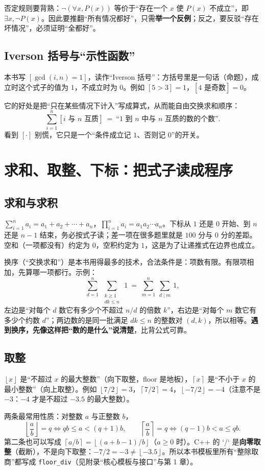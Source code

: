 \documentclass[UTF8,a4paper,11pt,twoside,openright,fontset=fandol]{ctexbook}
\theoremstyle{definition}
\newcommand{\floor}[1]{\left\lfloor #1\right\rfloor}
\newcommand{\ceil}[1]{\left\lceil #1\right\rceil}
\newcommand{\iva}[1]{\left[#1\right]}
\begin{document}
否定规则要背熟：$\lnot(\forall x,P(x))$ 等价于“存在一个 $x$ 使 $P(x)$ 不成立”，即 $\exists x,\lnot P(x)$。因此要推翻“所有情况都好”，只需\textbf{举一个反例}；反之，要反驳“存在坏情况”，必须证明“全都好”。

\subsection{Iverson 括号与“示性函数”}
本书写 $\iva{\gcd(i,n)=1}$，读作“Iverson 括号”：方括号里是一句话（命题），成立时这个式子的值为 $1$，不成立时为 $0$。例如 $\iva{5>3}=1$，$\iva{4\text{ 是奇数}}=0$。

它的好处是把“只在某些情况下计入”写成算式，从而能自由交换求和顺序：
\[
\sum_{i=1}^{n}\iva{i\text{ 与 }n\text{ 互质}}\ =\ \text{“}1\text{ 到 }n\text{ 中与 }n\text{ 互质的数的个数”}.
\]
看到 $\iva{\cdot}$ 别慌，它只是一个“条件成立记 $1$、否则记 $0$”的开关。

\section{求和、取整、下标：把式子读成程序}
\subsection{求和与求积}
$\sum_{i=1}^{n}a_i=a_1+a_2+\cdots+a_n$，$\prod_{i=1}^{n}a_i=a_1a_2\cdots a_n$。下标从 $1$ 还是 $0$ 开始、到 $n$ 还是 $n-1$ 结束，务必按式子读；差一项在很多题里就是 $100$ 分与 $0$ 分的差距。空和（一项都没有）约定为 $0$，空积约定为 $1$，这是为了让递推式在边界也成立。

换序（“交换求和”）是本书用得最多的技术，合法条件是：项数有限。有限项相加，先算哪一项都行。示例：
\[
\sum_{d=1}^{n}\ \sum_{\substack{k\ge 1\\dk\le n}}\ 1\ =\ \sum_{m=1}^{n}\ \sum_{d\mid m}\ 1,
\]
左边是“对每个 $d$ 数它有多少个不超过 $n/d$ 的倍数 $k$”，右边是“对每个 $m$ 数它有多少个约数 $d$”；两边数的是同一批满足 $dk\le n$ 的整数对 $(d,k)$，所以相等。\textbf{遇到换序，先像这样把“数的是什么”说清楚}，比背公式可靠。

\subsection{取整}
$\floor{x}$ 是“不超过 $x$ 的最大整数”（向下取整，floor 是地板），$\ceil{x}$ 是“不小于 $x$ 的最小整数”（向上取整）。例如 $\floor{7/2}=3$，$\ceil{7/2}=4$，$\floor{-7/2}=-4$（注意不是 $-3$：$-4$ 才是不超过 $-3.5$ 的最大整数）。

两条最常用性质：对整数 $a$ 与正整数 $b$，
\[
\floor{\frac{a}{b}}=q\iff qb\le a<(q+1)b,\qquad \ceil{\frac{a}{b}}=q\iff (q-1)b<a\le qb.
\]
第二条也可以写成 $\ceil{a/b}=\floor{(a+b-1)/b}$（$a\ge0$ 时）。C++ 的 `/` 是\textbf{向零取整}（截断），不是向下取整：$-7/2=-3\ne\floor{-3.5}$。所以本书模板里所有“整除取商”都写成 \texttt{floor\_div}（见附录“核心模板与接口”与第 1 章）。
\end{document}
